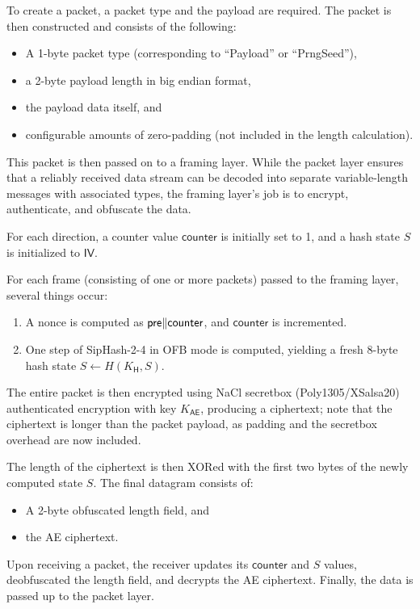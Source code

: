To create a packet, a packet type and the payload are required. The packet is then constructed and consists of the following:
\begin{itemize}
    \item A 1-byte packet type (corresponding to ``Payload'' or ``PrngSeed''),
    \item a 2-byte payload length in big endian format,
    \item the payload data itself, and
    \item configurable amounts of zero-padding (not included in the length calculation).
\end{itemize}

This packet is then passed on to a framing layer. While the packet layer ensures that a reliably received data stream can be decoded into separate variable-length messages with associated types, the framing layer's job is to encrypt, authenticate, and obfuscate the data.

For each direction, a counter value $\mathsf{counter}$ is initially set to 1, and a hash state $S$ is initialized to $\mathsf{IV}$.

For each frame (consisting of one or more packets) passed to the framing layer, several things occur:
\begin{enumerate}
    \item A nonce is computed as $ \mathsf{pre} \| \mathsf{counter}$, and $\mathsf{counter}$ is incremented.
    \item One step of SipHash-2-4 in OFB mode is computed, yielding a fresh 8-byte hash state $S \gets H(K_\mathsf{H}, S)$.
\end{enumerate}

The entire packet is then encrypted using NaCl secretbox (Poly1305/XSalsa20) authenticated encryption with key $K_\mathsf{AE}$, producing a ciphertext; note that the ciphertext is longer than the packet payload, as padding and the secretbox overhead are now included.

The length of the ciphertext is then XORed with the first two bytes of the newly computed state $S$. The final datagram consists of:
\begin{itemize}
    \item A 2-byte obfuscated length field, and
    \item the AE ciphertext.
\end{itemize}

Upon receiving a packet, the receiver updates its $\mathsf{counter}$ and $S$ values, deobfuscated the length field, and decrypts the AE ciphertext. Finally, the data is passed up to the packet layer.

